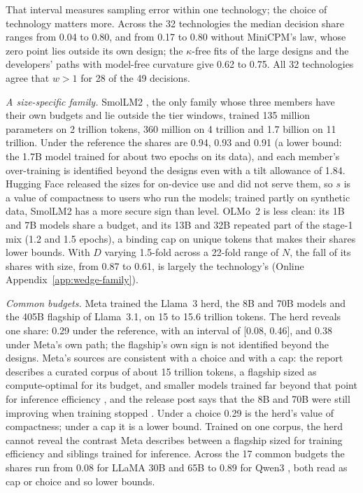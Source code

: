 That interval measures sampling error within one technology; the choice of technology matters more. Across the 32
technologies the median decision share ranges from 0.04 to 0.80, and from 0.17 to 0.80 without MiniCPM's law, whose zero
point lies outside its own design; the $\kappa$-free fits of the large designs and the developers' paths with model-free
curvature give 0.62 to 0.75. All 32 technologies agree that $w>1$ for 28 of the 49 decisions.

\textit{A size-specific family.} SmolLM2 \citep{benallal2025smollm2}, the only family whose three members have their own
budgets and lie outside the tier windows, trained 135 million parameters on 2 trillion tokens, 360 million on 4 trillion
and 1.7 billion on 11 trillion. Under the reference the shares are 0.94, 0.93 and 0.91 (a lower bound: the 1.7B model
trained for about two epochs on its data), and each member's over-training is identified beyond the designs even with a
tilt allowance of 1.84. Hugging Face released the sizes for on-device use and did not serve them, so $s$ is a value of
compactness to users who run the models; trained partly on synthetic data, SmolLM2 has a more secure sign than level.
OLMo~2 \citep{teamolmo2024olmo} is less clean: its 1B and 7B models share a budget, and its 13B and 32B repeated part of
the stage-1 mix (1.2 and 1.5 epochs), a binding cap on unique tokens that makes their shares lower bounds. With $D$
varying 1.5-fold across a 22-fold range of $N$, the fall of its shares with size, from 0.87 to 0.61, is largely the
technology's (Online Appendix~\ref{app:wedge-family}).

\textit{Common budgets.} Meta trained the Llama~3 herd, the 8B and 70B models and the 405B flagship of Llama~3.1, on 15
to 15.6 trillion tokens. The herd reveals one share: 0.29 under the reference, with an interval of [0.08, 0.46], and
0.38 under Meta's own path; the flagship's own sign is not identified beyond the designs. Meta's sources are consistent
with a choice and with a cap: the report describes a curated corpus of about 15 trillion tokens, a flagship sized as
compute-optimal for its budget, and smaller models trained far beyond that point for inference efficiency
\citep{grattafiori2024llama}, and the release post says that the 8B and 70B were still improving when training stopped
\citep{meta2024llama3}. Under a choice 0.29 is the herd's value of compactness; under a cap it is a lower bound. Trained
on one corpus, the herd cannot reveal the contrast Meta describes between a flagship sized for training efficiency and
siblings trained for inference. Across the 17 common budgets the shares run from 0.08 for LLaMA 30B and 65B
\citep{touvron2023llama} to 0.89 for Qwen3 \citep{yang2025qwen3}, both read as cap or choice and so lower bounds.

